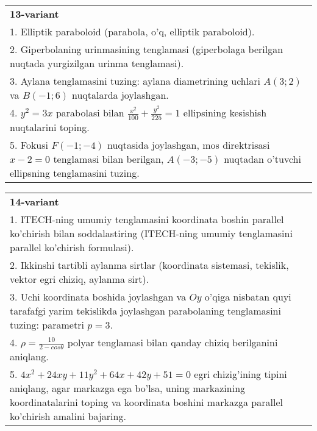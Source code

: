 \documentclass{article}
\begin{document}
\begin{tabular}{m{17cm}}
\textbf{13-variant}\\
1. Elliptik paraboloid (parabola, o'q, elliptik paraboloid).\\

2. Giperbolaning urinmasining tenglamasi (giperbolaga berilgan nuqtada yurgizilgan urinma tenglamasi).\\

3. Aylana tenglamasini tuzing: aylana diametrining uchlari $A(3;2)$ va $B(-1;6)$ nuqtalarda joylashgan.\\

4. $y^{2} = 3x$ parabolasi bilan $\frac{x^{2}}{100} + \frac{y^{2}}{225} = 1$ ellipsining kesishish nuqtalarini toping.  \\

5. Fokusi $F( - 1; - 4)$ nuqtasida joylashgan, mos direktrisasi $x - 2 = 0$ tenglamasi bilan berilgan, $A( - 3; - 5)$ nuqtadan o'tuvchi ellipsning tenglamasini tuzing.  
\end{tabular}
\vspace{1cm}


\begin{tabular}{m{17cm}}
\textbf{14-variant}\\
1. ITECH-ning umumiy tenglamasini koordinata boshin parallel ko'chirish bilan soddalastiring (ITECH-ning umumiy tenglamasini parallel ko'chirish formulasi).\\

2. Ikkinshi tartibli aylanma sirtlar (koordinata sistemasi, tekislik, vektor egri chiziq, aylanma sirt).\\

3. Uchi koordinata boshida joylashgan va $Oy$ o'qiga nisbatan quyi tarafafgi yarim tekislikda joylashgan parabolaning tenglamasini tuzing: parametri $p=3$.\\

4. $\rho = \frac{10}{2 - cos\theta}$ polyar tenglamasi bilan qanday chiziq berilganini aniqlang.  \\

5. $4x^{2} + 24xy + 11y^{2} + 64x + 42y + 51 = 0$ egri chizig'ining tipini aniqlang, agar markazga ega bo'lsa, uning markazining koordinatalarini toping va koordinata boshini markazga parallel ko'chirish amalini bajaring.
\end{tabular}
\vspace{1cm}
\end{document}
